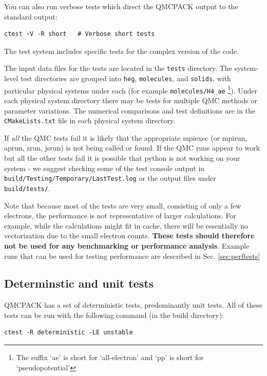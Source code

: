 You can also run verbose tests which direct the QMCPACK
output to the standard output:
\verbatimfont{\footnotesize}
\begin{verbatim}
ctest -V -R short   # Verbose short tests
\end{verbatim}

The test system includes specific tests for the complex version of the code.

The input data files for the tests are located in the \texttt{tests} directory.
The system-level test directories are grouped into \texttt{heg}, \texttt{molecules}, and \texttt{solids}, with particular physical systems under each (for example \texttt{molecules/H4\_ae}
\footnote{The suffix `ae' is short for `all-electron' and `pp' is short for `pseudopotential'}).
Under each physical system directory there may be tests for multiple QMC methods or parameter variations.
The numerical comparisons and test definitions are in the \texttt{CMakeLists.txt} file in each physical system directory.

If \textit{all} the QMC tests fail it is likely
that the appropriate mpiexec (or mpirun, aprun, srun, jsrun) is not being
called or found. If the QMC runs appear to work but all the other
tests fail it is possible that python is not working on your system -
we suggest checking some of the test console output in \texttt{build/Testing/Temporary/LastTest.log}
or the output files under \texttt{build/tests/}.


Note that because most of the tests are very small, consisting of only a few
electrons, the performance is not representative of larger
calculations. For example, while the calculations might fit in cache,
there will be essentially no vectorization due to the small electron
counts. \textbf{These tests should therefore not be used for any benchmarking or
performance analysis}. Example runs that can be used for testing performance are described in
Sec. \ref{sec:perftests}

\subsection{Determinstic and unit tests}

QMCPACK has a set of deterministic tests, predominantly unit tests.
All of these tests can be run with the following command (in the build directory):
\verbatimfont{\footnotesize}
\begin{verbatim}
ctest -R deterministic -LE unstable
\end{verbatim}

